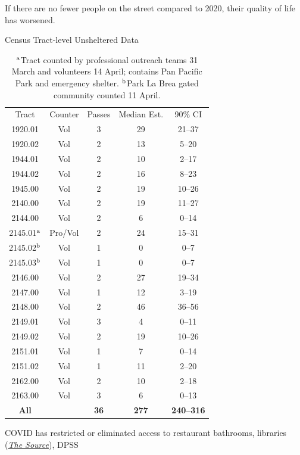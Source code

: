 \documentclass[11pt]{article}
\begin{document}
If there are no fewer people on the street compared to 2020, their quality of life has worsened. \begin{table}
\caption{Census Tract-level Unsheltered Data}
\centering
\begin{tabular}{ccccc}
\toprule
Tract & Counter & Passes & Median Est. & 90\% CI \\ \cmidrule{1-5}
1920.01 & Vol & 3 & 29 & 21--37 \\
1920.02 & Vol & 2 & 13 & 5--20 \\
1944.01 & Vol & 2 & 10 & 2--17 \\
1944.02 & Vol & 2 & 16 & 8--23 \\
1945.00 & Vol & 2 & 19 & 10--26 \\
2140.00 & Vol & 2 & 19 & 11--27 \\
2144.00 & Vol & 2 & 6 & 0--14 \\
2145.01$^{\rm a}$ & Pro/Vol & 2 & 24 & 15--31 \\
2145.02$^{\rm b}$  & Vol & 1 & 0 & 0--7 \\
2145.03$^{\rm b}$  & Vol & 1 & 0 & 0--7 \\
2146.00 & Vol & 2 & 27 & 19--34 \\
2147.00 & Vol & 1 & 12 & 3--19 \\
2148.00 & Vol & 2 & 46 & 36--56 \\
2149.01 & Vol & 3 & 4 & 0--11 \\
2149.02 & Vol & 2 & 19 & 10--26 \\
2151.01 & Vol & 1 & 7 & 0--14 \\
2151.02 & Vol & 1 & 11 & 2--20 \\
2162.00 & Vol & 2 & 10 & 2--18 \\
2163.00 & Vol & 3 & 6 & 0--13 \\
\cmidrule{1-5}
{\bf All} & & {\bf 36} & {\bf 277} & {\bf 240--316}
\\ \bottomrule
\end{tabular}
\caption*{$^{\rm a}$Tract counted by professional outreach teams
31 March and volunteers 14 April; contains Pan Pacific Park and emergency 
shelter. $^{\rm b}$Park La Brea gated community counted 11 April.}
\label{tbl:allTracts}
\end{table}COVID has restricted or eliminated access to restaurant bathrooms, libraries 
(\href{https://www.lapl.org/homeless-resources/the-source}{\it The Source}), DPSS 
\end{document}
